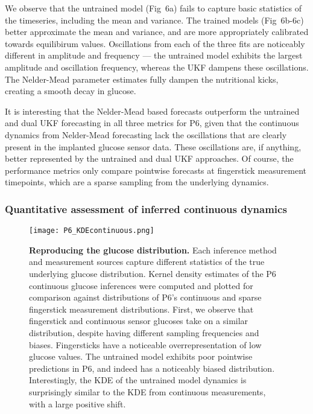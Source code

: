 \documentclass[10pt,letterpaper]{article}
\begin{document}
We observe that the untrained model (Fig~6a) fails to capture basic statistics of the timeseries, including the mean and variance. The trained models (Fig~6b-6c) better approximate the mean and variance, and are more appropriately calibrated towards equilibirum values.
Oscillations from each of the three fits are noticeably different in amplitude and frequency --- the untrained model exhibits the largest amplitude and oscillation frequency, whereas the UKF dampens these oscillations. The Nelder-Mead parameter estimates fully dampen the nutritional kicks, creating a smooth decay in glucose. 

It is interesting that the Nelder-Mead based forecasts outperform the untrained and dual UKF forecasting in all three metrics for P6, given that the continuous dynamics from Nelder-Mead forecasting lack the oscillations that are clearly present in the implanted glucose sensor data. These oscillations are, if anything, better represented by the untrained and dual UKF approaches. Of course, the performance metrics only compare pointwise forecasts at fingerstick measurement timepoints, which are a sparse sampling from the underlying dynamics.

\subsubsection{Quantitative assessment of inferred continuous dynamics}

\begin{figure}[!h]
    \centering
    \texttt{[image: P6\_KDEcontinuous.png]}
    \caption{{\bf Reproducing the glucose distribution.} 
    Each inference method and measurement sources capture different statistics of the true underlying glucose distribution. Kernel density estimates of the P6 continuous glucose inferences were computed and plotted for comparison against distributions of P6's continuous and sparse fingerstick measurement distributions. First, we observe that fingerstick and continuous sensor glucoses take on a similar distribution, despite having different sampling frequencies and biases. Fingersticks have a noticeable overrepresentation of low glucose values. The untrained model exhibits poor pointwise predictions in P6, and indeed has a noticeably biased distribution. Interestingly, the KDE of the untrained model dynamics is surprisingly similar to the KDE from continuous measurements, with a large positive shift.}
    \label{fig:KDEcontinuous}
\end{figure}
\end{document}
